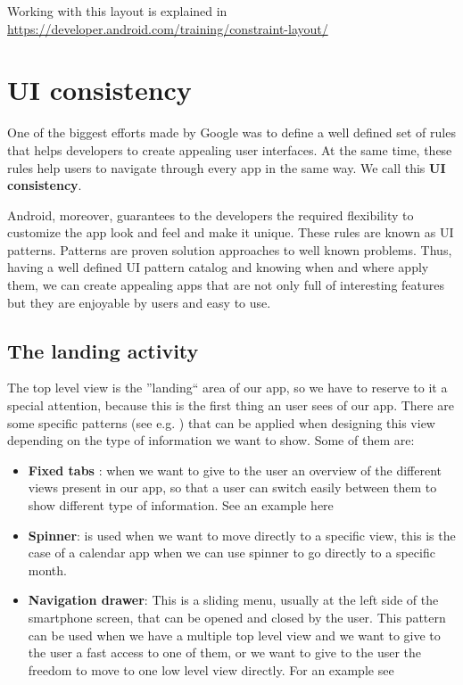 Working with this layout is explained in 
\url{https://developer.android.com/training/constraint-layout/}

\section{UI consistency}
One of the biggest efforts made by Google was to define a well defined set of rules that helps developers to create appealing user interfaces. At the same time, these rules help users to navigate through every app in the same way. We call this\textbf{ UI consistency}.

Android, moreover, guarantees to the developers the required flexibility to customize the app look and feel and make it unique.
These rules are known as UI patterns. Patterns are proven solution approaches to well known problems. Thus, having a well
defined UI pattern catalog and knowing when and where apply them, we can create appealing apps that are not only full of
interesting features but they are enjoyable by users and easy to use.

\subsection{The landing activity}
The top level view is the ''landing`` area of our app, so we have to reserve to it a special attention, because this is the first
thing an user sees of our app. There are some specific patterns (see e.g. \cite{Google2017c}) that can be applied when designing this view depending on the type of information we want to show. Some of them are:

\begin{itemize}
	\item \textbf{Fixed tabs} : when we want to give to
	the user an overview of the different views present in our app, so that a user can switch easily between them to show different type of information. See an example here \cite{Tamada2013}
	
	\item \textbf{Spinner}: is used when we want to move directly to a specific view, this is the case of a calendar app when we can use spinner to go directly to a specific month.
	
	\item \textbf{Navigation drawer}: This is a sliding menu, usually at the left side of the
	smartphone screen, that can be opened and closed by the user. This pattern can be used when we have a multiple top level view
	and we want to give to the user a fast access to one of them, or we want to give to the user the freedom to move to one low level
	view directly. For an example see  \cite{Google2017a}
\end{itemize}


